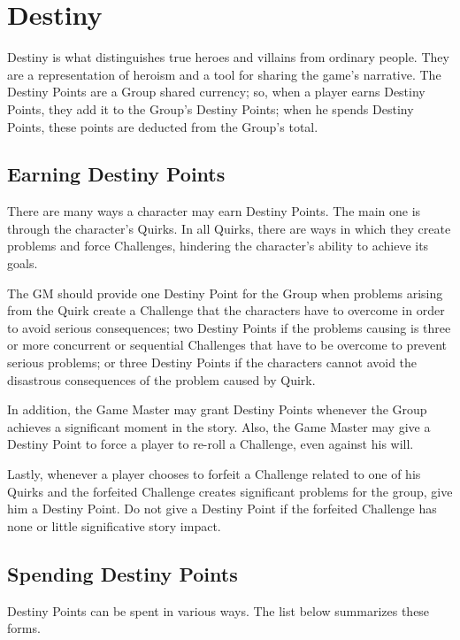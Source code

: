 \section{Destiny}\label{sec:destiny}
\begin{multicols}{2}
Destiny is what distinguishes true heroes and villains from ordinary people. They are a representation of heroism and a tool for sharing the game's narrative. The Destiny Points are a Group shared currency; so, when a player earns Destiny Points, they add it to the Group’s Destiny Points; when he spends Destiny Points, these points are deducted from the Group's total.

\subsection{Earning Destiny Points}\label{subsec:earndp}
\begin{wrapfigure}{r}{0.3\textwidth}
\end{wrapfigure}

There are many ways a character may earn Destiny Points. The main one is through the character's Quirks. In all Quirks, there are ways in which they create problems and force Challenges, hindering the character’s ability to achieve its goals.

The GM should provide one Destiny Point for the Group when problems arising from the Quirk create a Challenge that the characters have to overcome in order to avoid serious consequences; two Destiny Points if the problems causing is three or more concurrent or sequential Challenges that have to be overcome to prevent serious problems; or three Destiny Points if the characters cannot avoid the disastrous consequences of the problem caused by Quirk.

In addition, the Game Master may grant Destiny Points whenever the Group achieves a significant moment in the story. Also, the Game Master may give a Destiny Point to force a player to re-roll a Challenge, even against his will.

Lastly, whenever a player chooses to forfeit a Challenge related to one of his Quirks and the forfeited Challenge creates significant problems for the group, give him a Destiny Point. Do not give a Destiny Point if the forfeited Challenge has none or little significative story impact.

\subsection{Spending Destiny Points}\label{subsec:spenddp}
Destiny Points can be spent in various ways. The list below summarizes these forms.


\end{multicols}
